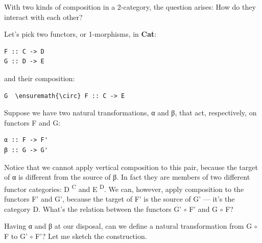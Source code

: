 \noindent
With two kinds of composition in a 2-category, the question arises: How
do they interact with each other?

Let's pick two functors, or 1-morphisms, in \textbf{Cat}:

\begin{Verbatim}[commandchars=\\\{\}]
F :: C -> D
G :: D -> E
\end{Verbatim}
and their composition:

\begin{Verbatim}[commandchars=\\\{\}]
G  \ensuremath{\circ} F :: C -> E
\end{Verbatim}
Suppose we have two natural transformations, α and β, that act,
respectively, on functors F and G:

\begin{Verbatim}[commandchars=\\\{\}]
α :: F -> F'
β :: G -> G'
\end{Verbatim}

\begin{figure}[H]
\centering
{}
\end{figure}

\noindent
Notice that we cannot apply vertical composition to this pair, because
the target of α is different from the source of β. In fact they are
members of two different functor categories: D \textsuperscript{C} and E
\textsuperscript{D}. We can, however, apply composition to the functors
F' and G', because the target of F' is the source of G' --- it's the
category D. What's the relation between the functors G' \ensuremath{\circ} F' and G  \ensuremath{\circ} F?

Having α and β at our disposal, can we define a natural transformation
from G  \ensuremath{\circ} F to G' \ensuremath{\circ} F'? Let me sketch the construction.

\begin{figure}[H]
\centering
{}
\end{figure}

